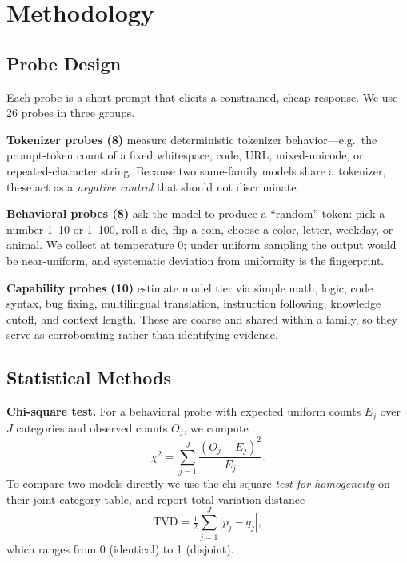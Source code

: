 \documentclass[10pt,twocolumn,letterpaper]{article}
\begin{document}
\section{Methodology}
\label{sec:method}

\subsection{Probe Design}
\label{sec:probes}
Each probe is a short prompt that elicits a constrained, cheap response. We use 26 probes in three groups.

\textbf{Tokenizer probes (8)} measure deterministic tokenizer behavior---e.g.\ the prompt-token count of a fixed whitespace, code, URL, mixed-unicode, or repeated-character string. Because two same-family models share a tokenizer, these act as a \emph{negative control} that should not discriminate.

\textbf{Behavioral probes (8)} ask the model to produce a ``random'' token: pick a number 1--10 or 1--100, roll a die, flip a coin, choose a color, letter, weekday, or animal. We collect at temperature 0; under uniform sampling the output would be near-uniform, and systematic deviation from uniformity is the fingerprint.

\textbf{Capability probes (10)} estimate model tier via simple math, logic, code syntax, bug fixing, multilingual translation, instruction following, knowledge cutoff, and context length. These are coarse and shared within a family, so they serve as corroborating rather than identifying evidence.

\subsection{Statistical Methods}
\label{sec:stats}

\textbf{Chi-square test.} For a behavioral probe with expected uniform counts $E_j$ over $J$ categories and observed counts $O_j$, we compute
\begin{equation}
\chi^2 = \sum_{j=1}^{J} \frac{(O_j - E_j)^2}{E_j}.
\end{equation}
To compare two models directly we use the chi-square \emph{test for homogeneity} on their joint category table, and report total variation distance
\begin{equation}
\mathrm{TVD} = \tfrac{1}{2}\sum_{j=1}^{J} \left| p_j - q_j \right|,
\end{equation}
which ranges from 0 (identical) to 1 (disjoint).
\end{document}
